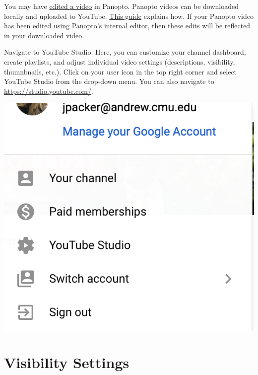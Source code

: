 
\begin{note}
    You may have \href{sec:panopto:editing_videos}{edited a video} in Panopto.
    Panopto videos can be downloaded locally and uploaded to YouTube.
    \href{https://www.panopto.com/blog/how-to-upload-a-panopto-video-to-youtube/}{This guide} explains how.
    If your Panopto video has been edited using Panopto's internal editor, then these edits will be reflected in your downloaded video.
\end{note}

\begin{gram}
    Navigate to YouTube Studio.
    Here, you can customize your channel dashboard, create playlists, and adjust individual video settings (descriptions, visibility, thumnbnails, etc.).
    Click on your user icon in the top right corner and select YouTube Studio from the drop-down menu.
    You can also navigate to \href{https://studio.youtube.com/}{https://studio.youtube.com/}.

    {
        \centering
        \includegraphics[scale=0.4]{youtube/media/09-youtube-studio.png}
    }
\end{gram}


\section{Visibility Settings}
\label{sec:youtube:visibility settings}

